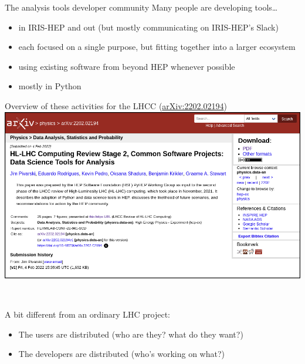 \documentclass[aspectratio=169]{beamer}
\begin{document}
\begin{frame}{The analysis tools developer community}
\large
{\Large Many people are developing tools\ldots}

\vspace{0.5 cm}
\begin{itemize}\setlength{\itemsep}{0.25 cm}
\item<2-> in IRIS-HEP and out (but mostly communicating on IRIS-HEP's Slack)
\item<3-> each focused on a single purpose, but fitting together into a larger ecosystem
\item<4-> using existing software from beyond HEP whenever possible
\item<5-> mostly in Python
\end{itemize}
\end{frame}

\begin{frame}{Overview of these activities for the LHCC (\href{https://arxiv.org/abs/2202.02194}{arXiv:2202.02194})}
\vspace{0.22 cm}
\includegraphics[width=\linewidth]{hl-lhc-data-science-tools-arXiv.png}
\end{frame}

\begin{frame}{\mbox{ }}
\begin{center}
\begin{minipage}{0.85\linewidth}
\large
{\Large A bit different from an ordinary LHC project:}

\vspace{0.25 cm}
\begin{itemize}\setlength{\itemsep}{0.25 cm}
\item The users are distributed (who are they? what do they want?)
\item The developers are distributed (who's working on what?)
\end{itemize}
\end{minipage}
\end{center}
\end{frame}
\end{document}
